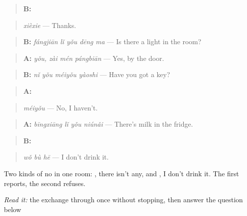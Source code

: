 \begin{quote}
\textbf{B:} 
\end{quote}

\begin{quote}
\emph{xièxie} — Thanks.
\end{quote}

\begin{quote}
\textbf{B:} \emph{fángjiān lǐ yǒu dēng ma} — Is there a light in the room?
\end{quote}

\begin{quote}
\textbf{A:} \emph{yǒu, zài mén pángbiān} — Yes, by the door.
\end{quote}

\begin{quote}
\textbf{B:} \emph{nǐ yǒu méiyǒu yàoshi} — Have you got a key?
\end{quote}

\begin{quote}
\textbf{A:} 
\end{quote}

\begin{quote}
\emph{méiyǒu} — No, I haven't.
\end{quote}

\begin{quote}
\textbf{A:} \emph{bīngxiāng lǐ yǒu niúnǎi} — There's milk in the fridge.
\end{quote}

\begin{quote}
\textbf{B:} 
\end{quote}

\begin{quote}
\emph{wǒ bù hē} — I don't drink it.
\end{quote}

Two kinds of no in one room: , there isn't any, and , I don't drink it. The first reports, the second refuses.

\begin{tcolorbox}[breakable,skin=enhanced,colback=orange!6,colframe=orange!45!black,boxrule=0.5pt,arc=1mm,left=6pt,right=6pt,top=4pt,bottom=4pt,fonttitle=\bfseries,title={Read this}]
\emph{Read it:} the exchange through once without stopping, then answer the question below
\end{tcolorbox}


